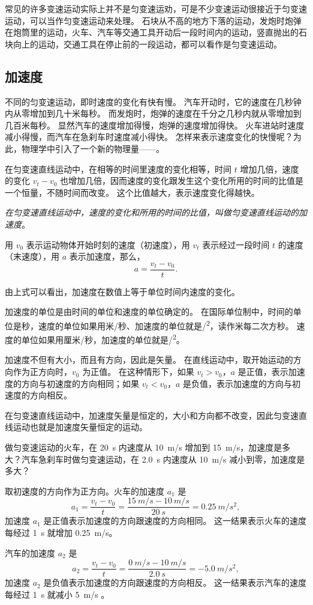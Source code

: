 常见的许多变速运动实际上并不是匀变速运劝，可是不少变速运动很接近于匀变速运动，可以当作匀变速运动来处理。
石块从不高的地方下落的运动，发炮时炮弹在炮筒里的运动，火车、汽车等交通工具开动后一段时间内的运动，竖直抛出的石块向上的运动，交通工具在停止前的一段运动，都可以看作是匀变速运动。

\subsection{加速度}
不同的匀变速运动，即时速度的变化有快有慢。
汽车开动时，它的速度在几秒钟内从零增加到几十米每秒。
而发炮时，炮弹的速度在千分之几秒内就从零增加到几百米每秒。
显然汽车的速度增加得慢，炮弹的速度增加得快。
火车进站时速度减小得慢，而汽车在急刹车时速度减小得快。
怎样来表示速度变化的快慢呢？为此，物理学中引入了一个新的物理量——。

在匀变速直线运动中，在相等的时间里速度的变化相等，时间 $t$ 增加几倍，速度的变化 $v_t-v_0$ 也增加几倍，因而速度的变化跟发生这个变化所用的时间的比值是一个恒量，不随时间而改变。
这个比值越大，表示速度变化得越快。

\emph{在匀变速直线运动中，速度的变化和所用的时间的比值，叫做匀变速直线运动的加速度}。

用 $v_0$ 表示运动物体开始时刻的速度（初速度），用 $v_t$ 表示经过一段时间 $t$ 的速度（末速度），用 $a$ 表示加速度，那么，
\[a=\frac{v_t-v_0}{t}.\]

由上式可以看出，加速度在数值上等于单位时间内速度的变化。

加速度的单位是由时间的单位和速度的单位确定的。
在国际单位制中，时间的单位是秒，速度的单位如果用米/秒、加速度的单位就是\unit{/^2}，读作米每二次方秒。
速度的单位如果用厘米/秒，加速度的单位就是\unit{/^2}。

加速度不但有大小，而且有方向，因此是矢量。
在直线运动中，取开始运动的方向作为正方向时，$v_0$ 为正值。
在这种情形下，如果 $v_t>v_0$，$a$ 是正值，表示加速度的方向与初速度的方向相同；如果 $v_t<v_0$，$a$ 是负值，表示加速度的方向与初速度的方向相反。

在匀变速直线运动中，加速度矢量是恒定的，大小和方向都不改变，因此匀变速直线运动也就是加速度矢量恒定的运动。

\begin{example}
做匀变速运动的火车，在 \qty{20}{s} 内速度从 \qty{10}{m/s} 增加到 \qty{15}{m/s}，加速度是多大？汽车急刹车时做匀变速运动，在 \qty{2.0}{s} 内速度从 \qty{10}{m/s} 减小到零，加速度是多大？
\end{example}

\begin{solution}
取初速度的方向作为正方向。火车的加速度 $a_1$ 是
\[a_1=\frac{v_t-v_0}{t}=\frac{\qty{15}{m/s}-\qty{10}{m/s}}{\qty{20}{s}}=\qty{0.25}{m/s^2},\]
加速度 $a_1$ 是正值表示加速度的方向跟速度的方向相同。
这一结果表示火车的速度每经过 \qty{1}{s} 就增加 \qty{0.25}{m/s}。

汽车的加速度 $a_2$ 是
\[a_2=\frac{v_t-v_0}{t}=\frac{\qty{0}{m/s}-\qty{10}{m/s}}{\qty{2.0}{s}}=\qty{-5.0}{m/s^2},\]
加速度 $a_2$ 是负值表示加速度的方向跟速度的方向相反。
这一结果表示汽车的速度每经过 \qty{1}{s} 就减小 \qty{5}{m/s} 。
\end{solution}

